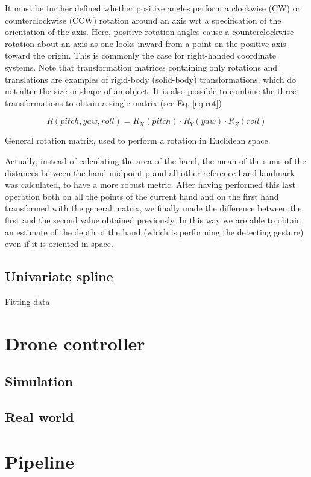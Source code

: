 \noindent It must be further deﬁned whether positive angles perform a clockwise (CW) or counterclockwise (CCW) rotation around an axis \gls{wrt} a speciﬁcation of the orientation of the axis. Here, positive rotation angles cause a counterclockwise rotation about an axis as one looks inward from a point on the positive axis toward the origin. This is commonly the case for right-handed coordinate systems. Note that transformation matrices containing only rotations and translations are examples of rigid-body (solid-body) transformations, which do not alter the size or shape of an object. It is also possible to combine the three transformations to obtain a single matrix (see Eq. \ref{eq:rot})

\begin{Equation}[H]
	\centering
	\begin{equation} \label{eq:rot}
		R(pitch, yaw, roll) = R_X(pitch) \cdot R_Y(yaw) \cdot R_Z(roll)
	\end{equation}
	\caption[General Rotation.]{General rotation matrix, used to perform a rotation in Euclidean space.}
\end{Equation}

\noindent Actually, instead of calculating the area of the hand, the mean of the sums of the distances between the hand midpoint p and all other reference hand landmark was calculated, to have a more robust metric. After having performed this last operation both on all the points of the current hand and on the first hand transformed with the general matrix, we finally made the difference between the first and the second value obtained previously. In this way we are able to obtain an estimate of the depth of the hand (which is performing the detecting gesture) even if it is oriented in space.



\subsection{Univariate spline}
\label{sec:univspline}
Fitting data

\section{Drone controller}
\label{sec:dronecontrl}

\subsection{Simulation}
\label{sec:simulation}

\subsection{Real world}
\label{sec:simulation}

\section{Pipeline}
\label{sec:pipeline}
